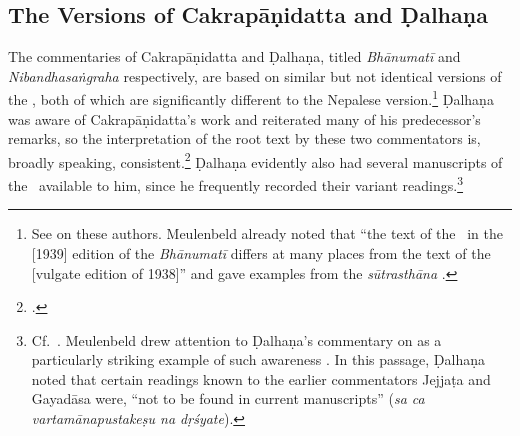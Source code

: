 \subsection{The Versions of Cakrapāṇidatta and Ḍalhaṇa}

The commentaries of Cakrapāṇidatta and Ḍalhaṇa, titled \emph{Bhānumatī} and
\emph{Nibandhasaṅgraha} respectively, are based on similar but not identical
versions of the \SS, both of which are significantly different to the Nepalese
version.\footnote{See \cite[IA 374--379]{meul-hist} on these authors. Meulenbeld
already noted that “the text of the \SS\ in the [1939] edition of the
\emph{Bhānumatī} differs at many places from the text of the [vulgate edition of
1938]” and gave examples from the \emph{sūtrasthāna} \citep[IB, 496, note
76]{meul-hist}.} Ḍalhaṇa was aware of Cakrapāṇidatta's work and reiterated many of
his predecessor's remarks, so the interpretation of the root text by these two
commentators is, broadly speaking, consistent.\footcite[IB, 499,
n.\,162]{meul-hist}  Ḍalhaṇa evidently also had several manuscripts of the \SS\
available to him, since he frequently recorded their variant
readings.\footnote{Cf.\ \cite[IA, 377]{meul-hist}.  Meulenbeld drew attention to
Ḍalhaṇa's commentary on \Su{5.8.24cd--25ab}{587} as a particularly striking
example of such awareness \citep[IB, 497, n.\,112]{meul-hist}.  In this passage, Ḍalhaṇa
noted that certain readings known to the earlier commentators Jejjaṭa and Gayadāsa
were, “not to be found in current manuscripts” (\emph{sa ca vartamānapustakeṣu na
dṛśyate}).}

